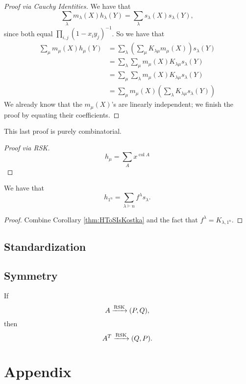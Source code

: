 \documentclass{article}
\DeclareMathOperator{\RSK}{RSK}
\DeclareMathOperator{\col}{col}
\newcommand{\rskarrow}{\ensuremath\xrightarrow{\RSK}}
\begin{document}
\begin{proof}[Proof via Cauchy Identities]
    We have that
    \[
        \sum_\lambda m_\lambda(X)h_\lambda(Y) = \sum_\lambda s_\lambda(X) s_\lambda(Y),
    \]
    since both equal $\prod_{i,j}(1-x_iy_j)^{-1}$.
    So we have that
    \begin{align*}
        \sum_\mu m_\mu(X)h_\mu(Y) &= \sum_\lambda \left( \sum_\mu K_{\lambda\mu} m_\mu(X) \right) s_\lambda(Y) \\
                                  &= \sum_\lambda \sum_\mu m_\mu(X) K_{\lambda\mu} s_\lambda(Y) \\
                                  &= \sum_\mu \sum_\lambda m_\mu(X) K_{\lambda\mu} s_\lambda(Y) \\
                                  &= \sum_\mu m_\mu(X) \left(\sum_\lambda K_{\lambda\mu} s_\lambda(Y)\right)
    \end{align*}
    We already know that the $m_\mu(X)$'s are linearly independent; we finish the proof by equating their coefficients.
\end{proof}

This last proof is purely combinatorial. 

\begin{proof}[Proof via RSK]
    \[
        h_\mu = \sum_A x^{\col A}
    \]
\end{proof}

\begin{corollary}
    We have that
    \[
        h_{1^n} = \sum_{\lambda \vdash n} f^\lambda s_\lambda.
    \]
\end{corollary}

\begin{proof}
    Combine Corollary \ref{thm:HToSIsKostka} and the fact that $f^\lambda = K_{\lambda,1^n}$.
\end{proof}

\subsection{Standardization}

\subsection{Symmetry}
\begin{theorem}
    If
    \[
        A \rskarrow (P,Q),
    \]
    then
    \[
        A^T \rskarrow (Q,P).
    \]
\end{theorem}

\section{Appendix}
\end{document}
